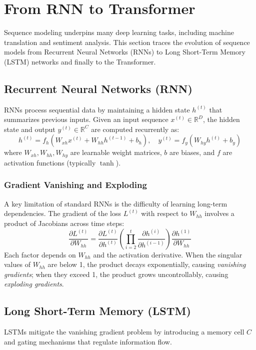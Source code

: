 \section{From RNN to Transformer}

Sequence modeling underpins many deep learning tasks, including machine translation and sentiment analysis. This section traces the evolution of sequence models from Recurrent Neural Networks (RNNs) to Long Short-Term Memory (LSTM) networks and finally to the Transformer.

\subsection{Recurrent Neural Networks (RNN)}
RNNs process sequential data by maintaining a hidden state $h^{(t)}$ that summarizes previous inputs. Given an input sequence $x^{(t)} \in \mathbb{R}^D$, the hidden state and output $y^{(t)} \in \mathbb{R}^C$ are computed recurrently as:
\begin{equation}
    h^{(t)} = f_h(W_{xh}x^{(t)} + W_{hh}h^{(t-1)} + b_h), \quad y^{(t)} = f_y(W_{hy}h^{(t)} + b_y)
\end{equation}
where $W_{xh}, W_{hh}, W_{hy}$ are learnable weight matrices, $b$ are biases, and $f$ are activation functions (typically $\tanh$).

\subsubsection{Gradient Vanishing and Exploding}
A key limitation of standard RNNs is the difficulty of learning long-term dependencies. The gradient of the loss $L^{(t)}$ with respect to $W_{hh}$ involves a product of Jacobians across time steps:
\begin{equation}
    \frac{\partial L^{(t)}}{\partial W_{hh}} = \frac{\partial L^{(t)}}{\partial h^{(t)}} \left( \prod_{i=2}^{t} \frac{\partial h^{(i)}}{\partial h^{(i-1)}} \right) \frac{\partial h^{(1)}}{\partial W_{hh}}
\end{equation}
Each factor depends on $W_{hh}$ and the activation derivative. When the singular values of $W_{hh}$ are below 1, the product decays exponentially, causing \textit{vanishing gradients}; when they exceed 1, the product grows uncontrollably, causing \textit{exploding gradients}.

\subsection{Long Short-Term Memory (LSTM)}
LSTMs mitigate the vanishing gradient problem by introducing a memory cell $C$ and gating mechanisms that regulate information flow.

